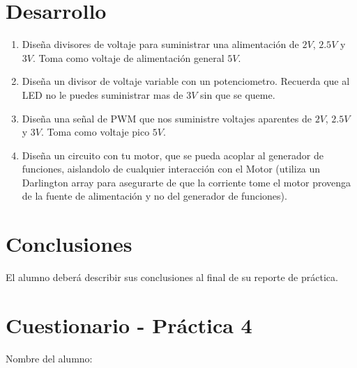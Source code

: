 
\section{Desarrollo}

	\begin{enumerate}
		\item Diseña divisores de voltaje para suministrar una alimentación de $2 V$, $2.5 V$ y $3 V$. Toma como voltaje de alimentación general $5 V$.
		\item Diseña un divisor de voltaje variable con un potenciometro. Recuerda que al LED no le puedes suministrar mas de $3 V$ sin que se queme.
		\item Diseña una señal de PWM que nos suministre voltajes aparentes de $2 V$, $2.5 V$ y $3 V$. Toma como voltaje pico $5 V$.
		\item Diseña un circuito con tu motor, que se pueda acoplar al generador de funciones, aislandolo de cualquier interacción con el Motor (utiliza un Darlington array para asegurarte de que la corriente tome el motor provenga de la fuente de alimentación y no del generador de funciones).
	\end{enumerate}



\section{Conclusiones}

	El alumno deberá describir sus conclusiones al final de su reporte de práctica.


\clearpage
\section{Cuestionario - Práctica 4}
	Nombre del alumno: \\[0.2cm]
	\horrule{0.5pt} \\[0.2cm] %

